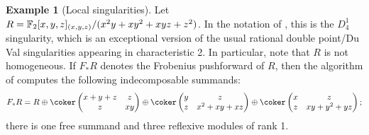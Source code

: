 \documentclass[12pt]{article}
\theoremstyle{theorem}
\numberwithin{thm}{section}
\theoremstyle{definition}
\newtheorem{exa}[thm]{Example}
\newcommand{\mahrud}[1]{{\color{ForestGreen} \sf $\blacklozenge$ Mahrud: [#1]}}
\begin{document}

\begin{exa}[Local singularities]
  Let $R=\mathbb F_2[x,y,z]_{(x,y,z)}/(x^2y+xy^2+xyz+z^2)$. In the notation of \cite{Artin77}, this is the $D_4^1$ singularity, which is an exceptional version of the usual rational double point/Du Val singularities appearing in characteristic 2.  In particular, note that $R$ is not homogeneous. If $F_* R$ denotes the Frobenius pushforward of $R$, then the algorithm of  computes the following indecomposable summands:
  $$
  F_*R = R\oplus
  \coker
  \begin{pmatrix}
    x+y+z&z\\
    z&xy
  \end{pmatrix}\oplus\coker \begin{pmatrix}
    y&z\\
    z&x^{2}+xy+xz
  \end{pmatrix}\oplus \coker\begin{pmatrix}
  x&z\\
  z&xy+y^{2}+yz
  \end{pmatrix};
  $$
  there is one free summand and three reflexive modules of rank 1.
\end{exa}
\end{document}
